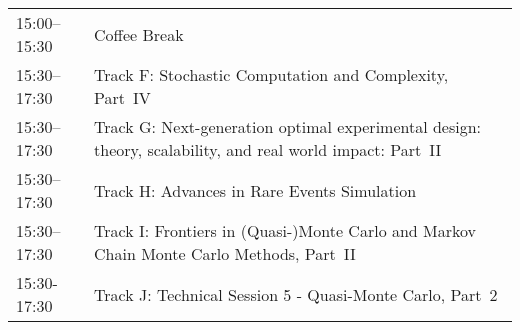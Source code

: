 \begin{table}
{\begin{tabularx}{\textwidth}{>{\hsize=0.32\hsize}X|>{\hsize=1.7\hsize}X}
\cellcolor{\EmptyColor}15:00–15:30 & \cellcolor{\EmptyColor}Coffee Break \\
\cellcolor{\SessionTitleColor}15:30–17:30 & \cellcolor{\SessionTitleColor}Track F: Stochastic Computation and Complexity, Part~IV \\
\cellcolor{\SessionTitleColor}15:30–17:30 & \cellcolor{\SessionTitleColor}Track G: Next-generation optimal experimental design: theory, scalability, and real world impact: Part~II \\
\cellcolor{\SessionTitleColor}15:30–17:30 & \cellcolor{\SessionTitleColor}Track H: Advances in Rare Events Simulation \\
\cellcolor{\SessionTitleColor}15:30–17:30 & \cellcolor{\SessionTitleColor}Track I: Frontiers in (Quasi-)Monte Carlo and Markov Chain Monte Carlo Methods, Part~II \\
\cellcolor{\SessionLightColor}15:30-17:30 & \cellcolor{\SessionLightColor}Track J: Technical Session 5 - Quasi-Monte Carlo, Part~2 \\
\hline
\end{tabularx}
}
\end{table}

